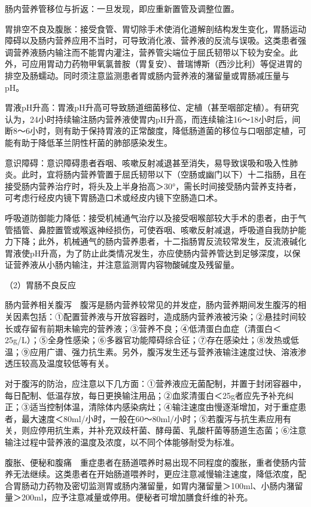 肠内营养管移位与折返：一旦发现，即应重新置管及调整位置。

胃排空不良及腹胀：接受食管、胃切除手术使消化道解剖结构发生变化，胃肠运动障碍以及肠内营养应用不当时，可导致消化液、营养液的反流与误吸。这类患者强调营养液肠内输注而不能胃内灌注，营养管尖端位于屈氏韧带以下较为安全。此外，可应用胃动力药物甲氧氯普胺（胃复安）、普瑞博斯（西沙比利）等促进胃的排空及肠蠕动。同时须注意监测患者胃或肠内营养液的潴留量或胃肠减压量与pH。

胃液pH升高：胃液pH升高可导致肠道细菌移位、定植（甚至咽部定植）。有研究认为，24小时持续输注肠内营养液使胃内pH升高，而连续输注16～18小时后，间断8～6小时，则有助于保持胃液的正常酸度，降低肠道菌的移位与口咽部定植，可能有助于降低革兰阴性杆菌的肺部感染发生。

意识障碍：意识障碍患者吞咽、咳嗽反射减退甚至消失，易导致误吸和吸入性肺炎。此时，宜将肠内营养管置于屈氏韧带以下（空肠或幽门以下）十二指肠，且在接受肠内营养治疗时，将头及上半身抬高＞30°，需长时间接受肠内营养支持者，可考虑行经皮内镜下胃肠造口术或经皮内镜下空肠造口术。

呼吸道防御能力降低：接受机械通气治疗以及接受咽喉部较大手术的患者，由于气管插管、鼻腔置管或喉返神经损伤，可使吞咽、咳嗽反射减退，呼吸道自我防护能力下降；此外，机械通气的肠内营养患者，十二指肠胃反流较常发生，反流液碱化胃液使pH升高，为了防止此类情况发生，亦应使肠内营养管达到足够深度，以保证营养液从小肠内输注，并注意监测胃内容物酸碱度及残留量。

（2）胃肠不良反应

肠内营养相关腹泻　腹泻是肠内营养较常见的并发症，肠内营养期间发生腹泻的相关因素包括：①配置营养液与开放容器时，造成肠内营养液被污染；②悬挂时间较长或存留有前期未输完的营养液；③营养不良；④低清蛋白血症（清蛋白＜25g/L）；⑤全身性感染；⑥多器官功能障碍综合征；⑦存在感染灶；⑧发热或低温；⑨应用广谱、强力抗生素。另外，腹泻发生还与营养液输注速度过快、溶液渗透压较高及温度较低等有关。

对于腹泻的防治，应注意以下几方面：①营养液应无菌配制，并置于封闭容器中，每日配制、低温存放，每日更换输注用品；②血浆清蛋白＜25g者应先予补充纠正；③适当控制体温，清除体内感染病灶；④输注速度由慢逐渐增加，对于重症患者，最大速度＜80ml/小时，一般在60～80ml/小时；⑤若腹泻与抗生素应用有关，则应停用抗生素，并补充双歧杆菌、酵母菌、乳酸杆菌等肠道生态菌；⑥注意输注过程中营养液的温度及浓度，以不同个体能够耐受为标准。

腹胀、便秘和腹痛　重症患者在肠道喂养时易出现不同程度的腹胀，重者使肠内营养无法继续。这类患者在开始肠道喂养时，更应注意减慢输注速度，降低浓度，配合胃肠动力药物及密切监测胃或肠内潴留量，如胃内潴留量＞100ml、小肠内潴留量＞200ml，应予注意减量或停用。便秘者可增加膳食纤维的补充。

